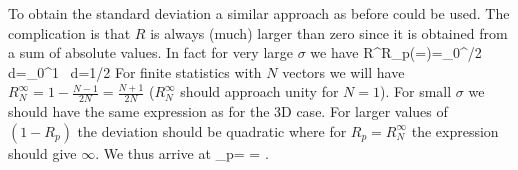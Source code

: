 To obtain the standard deviation a similar approach as before could be used. The complication is that $R$ is always (much) larger than zero since it is obtained from a sum of absolute values. In fact for very large $\sigma$ we have
\beq
R^\infty \equiv R_p(\sigma=\infty)=\int_0^{\pi/2} \cos{\theta}\,\sin{\theta} d\theta =\int_0^1 \cos{\theta}\, d\cos{\theta}=1/2
\eeq
For finite statistics with $N$ vectors we will have $R_N^\infty=1-\frac{N-1}{2N}= \frac{N+1}{2N}$ ($R_N^\infty$ should approach unity for $N=1$). For small $\sigma$ we should have the same expression as for the 3D case. For larger values of $(1-R_p)$ the deviation should be quadratic where for $R_p=R_N^\infty$ the expression should give $\infty$. We thus arrive at
\beq
\sigma_p=  = \;.
\eeq 
